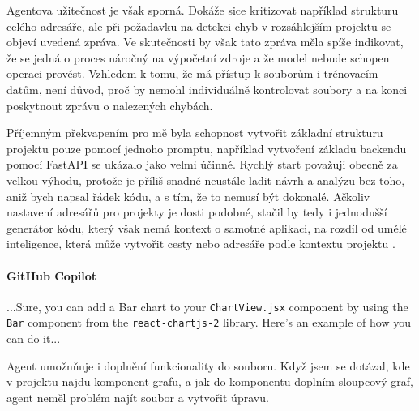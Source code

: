 \documentclass[FM,DP]{tulthesis}
\begin{document}
		Agentova užitečnost je však sporná. Dokáže sice kritizovat například strukturu celého adresáře, ale při požadavku na detekci chyb v rozsáhlejším projektu se objeví uvedená zpráva. Ve skutečnosti by však tato zpráva měla spíše indikovat, že se jedná o proces náročný na výpočetní zdroje a že model nebude schopen operaci provést. Vzhledem k tomu, že má přístup k souborům i trénovacím datům, není důvod, proč by nemohl individuálně kontrolovat soubory a na konci poskytnout zprávu o nalezených chybách.
		
		Příjemným překvapením pro mě byla schopnost vytvořit základní strukturu projektu pouze pomocí jednoho promptu, například vytvoření základu backendu pomocí FastAPI se ukázalo jako velmi účinné. Rychlý start považuji obecně za velkou výhodu, protože je příliš snadné neustále ladit návrh a analýzu bez toho, aniž bych napsal řádek kódu, a s tím, že to nemusí být dokonalé. Ačkoliv nastavení adresářů pro projekty je dosti podobné, stačil by tedy i jednodušší generátor kódu, který však nemá kontext o samotné aplikaci, na rozdíl od umělé inteligence, která může vytvořit cesty nebo adresáře podle kontextu projektu \cite{typescript} \cite{workspace:fastAPI}.
		
		\vspace{0.6em}
		\begin{tcolorbox}[colback=white,colframe=black]
			\paragraph{GitHub Copilot}
			...Sure, you can add a Bar chart to your \verb|ChartView.jsx| component by using the \verb|Bar| component from the \verb|react-chartjs-2| library. Here's an example of how you can do it... \cite{rag_chart}
		\end{tcolorbox}
		
		Agent umožnňuje i doplnění funkcionality do souboru. Když jsem se dotázal, kde v projektu najdu komponent grafu, a jak do komponentu doplním sloupcový graf, agent neměl problém najít soubor a vytvořit úpravu. 
		
		\vspace{0.6em}
		
\end{document}
